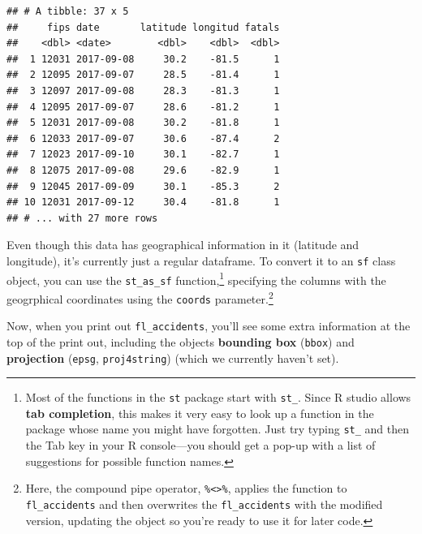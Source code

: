 \documentclass[]{tufte-book}
\newenvironment{Shaded}{}{}
\newcommand{\DataTypeTok}[1]{\textcolor[rgb]{0.56,0.13,0.00}{#1}}
\newcommand{\DecValTok}[1]{\textcolor[rgb]{0.25,0.63,0.44}{#1}}
\newcommand{\KeywordTok}[1]{\textcolor[rgb]{0.00,0.44,0.13}{\textbf{#1}}}
\newcommand{\NormalTok}[1]{#1}
\newcommand{\OperatorTok}[1]{\textcolor[rgb]{0.40,0.40,0.40}{#1}}
\newcommand{\StringTok}[1]{\textcolor[rgb]{0.25,0.44,0.63}{#1}}
\begin{document}
\begin{verbatim}
## # A tibble: 37 x 5
##     fips date       latitude longitud fatals
##    <dbl> <date>        <dbl>    <dbl>  <dbl>
##  1 12031 2017-09-08     30.2    -81.5      1
##  2 12095 2017-09-07     28.5    -81.4      1
##  3 12097 2017-09-08     28.3    -81.3      1
##  4 12095 2017-09-07     28.6    -81.2      1
##  5 12031 2017-09-08     30.2    -81.8      1
##  6 12033 2017-09-07     30.6    -87.4      2
##  7 12023 2017-09-10     30.1    -82.7      1
##  8 12075 2017-09-08     29.6    -82.9      1
##  9 12045 2017-09-09     30.1    -85.3      2
## 10 12031 2017-09-12     30.4    -81.8      1
## # ... with 27 more rows
\end{verbatim}

Even though this data has geographical information in it (latitude and longitude), it's currently
just a regular dataframe. To convert it to an \texttt{sf} class object, you can use the \texttt{st\_as\_sf} function,\footnote{Most of the functions in the \texttt{st} package start with \texttt{st\_}. Since R studio allows \textbf{tab completion},
  this makes it very easy to look up a function in the package whose name you might have forgotten.
  Just try typing \texttt{st\_} and then the Tab key in your R console---you should get a pop-up with a list of
  suggestions for possible function names.}
specifying the columns with the geogrphical coordinates using the \texttt{coords} parameter.\footnote{Here, the
  compound pipe operator, \texttt{\%\textless{}\textgreater{}\%}, applies the function to \texttt{fl\_accidents} and then overwrites the
  \texttt{fl\_accidents} with the modified version, updating the object so you're ready to use it for later
  code.}

\begin{Shaded}
\end{Shaded}

Now, when you print out \texttt{fl\_accidents}, you'll see some extra information at the top of the print
out, including the objects \textbf{bounding box} (\texttt{bbox}) and \textbf{projection} (\texttt{epsg}, \texttt{proj4string})
(which we currently haven't set).
\end{document}
